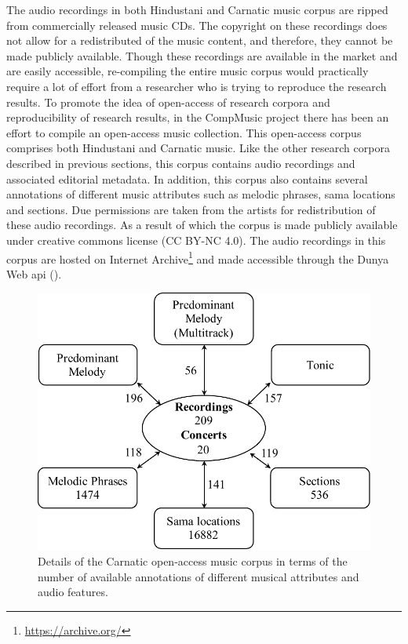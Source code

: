 The audio recordings in both Hindustani and Carnatic music corpus are ripped from commercially released music CDs. The copyright on these recordings does not allow for a redistributed of the music content, and therefore, they cannot be made publicly available. Though these recordings are available in the market and are easily accessible, re-compiling the entire music corpus would practically require a lot of effort from a researcher who is trying to reproduce the research results. To promote the idea of open-access of research corpora and reproducibility of research results, in the CompMusic project there has been an effort to compile an open-access music collection. This open-access corpus comprises both Hindustani and Carnatic music. Like the other research corpora described in previous sections, this corpus contains audio recordings and associated editorial metadata. In addition, this corpus also contains several annotations of different music attributes such as melodic phrases, sama locations and sections. Due permissions are taken from the artists for redistribution of these audio recordings. As a result of which the corpus is made publicly available under creative commons license (CC BY-NC 4.0). The audio recordings in this corpus are hosted on Internet Archive\footnote{\url{https://archive.org/}} and made accessible through the Dunya Web \gls{api} (). 


\begin{figure}
	\begin{center}
		\includegraphics[width=\figSizeSeventyFive]{ch04_datasets/figures/carnatic_CC_details.pdf}
	\end{center}
	\caption[Details of the Carnatic open-access music corpus]{Details of the Carnatic open-access music corpus in terms of the number of available annotations of different musical attributes and audio features.}
	\label{fig:carnatic_open_access_corpus_details}
\end{figure}

